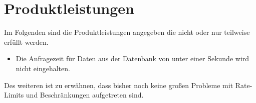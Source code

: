 \section{Produktleistungen}
Im Folgenden sind die Produktleistungen angegeben die nicht oder nur teilweise erfüllt werden.
\begin{itemize}
\item Die Anfragezeit für Daten aus der Datenbank von unter einer Sekunde wird nicht eingehalten.
\end{itemize}
Des weiteren ist zu erwähnen, dass bisher noch keine großen Probleme mit Rate-Limits und Beschränkungen aufgetreten sind.
